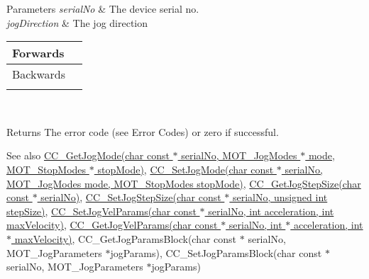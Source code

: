 \begin{DoxyParams}{Parameters}
{\em serial\+No} & The device serial no. \\
\hline
{\em jog\+Direction} & The jog direction \begin{tabularx}{\linewidth}{|*{2}{>{\raggedright\arraybackslash}X|}}\hline
Forwards&1 \\\cline{1-2}
Backwards&2 \\\cline{1-2}
\end{tabularx}
\\
\hline
\end{DoxyParams}
\begin{DoxyReturn}{Returns}
The error code (see Error Codes) or zero if successful. 
\end{DoxyReturn}
\begin{DoxySeeAlso}{See also}
\hyperlink{group___k_cube_d_c_servo_gaedfce16951a36423bd67cec88d8aee00}{C\+C\+\_\+\+Get\+Jog\+Mode(char const $\ast$ serial\+No, M\+O\+T\+\_\+\+Jog\+Modes $\ast$ mode, M\+O\+T\+\_\+\+Stop\+Modes $\ast$ stop\+Mode)}, \hyperlink{group___k_cube_d_c_servo_gadbac7a9d5c2f6ce7c59b853075139999}{C\+C\+\_\+\+Set\+Jog\+Mode(char const $\ast$ serial\+No, M\+O\+T\+\_\+\+Jog\+Modes mode, M\+O\+T\+\_\+\+Stop\+Modes stop\+Mode)}, \hyperlink{group___k_cube_d_c_servo_gafb6d1fa4b61ec567026da2b1f761ee65}{C\+C\+\_\+\+Get\+Jog\+Step\+Size(char const $\ast$ serial\+No)}, \hyperlink{group___k_cube_d_c_servo_ga1d986216045157d086ab1c9f80b9d461}{C\+C\+\_\+\+Set\+Jog\+Step\+Size(char const $\ast$ serial\+No, unsigned int step\+Size)}, \hyperlink{group___k_cube_d_c_servo_ga6fca67412dd838f9d4b94922379e7e59}{C\+C\+\_\+\+Set\+Jog\+Vel\+Params(char const $\ast$ serial\+No, int acceleration, int max\+Velocity)}, \hyperlink{group___k_cube_d_c_servo_gad5bd91c34f134307376145710c1a4c5b}{C\+C\+\_\+\+Get\+Jog\+Vel\+Params(char const $\ast$ serial\+No, int $\ast$ acceleration, int $\ast$ max\+Velocity)}, C\+C\+\_\+\+Get\+Jog\+Params\+Block(char const $\ast$ serial\+No, M\+O\+T\+\_\+\+Jog\+Parameters $\ast$jog\+Params), C\+C\+\_\+\+Set\+Jog\+Params\+Block(char const $\ast$ serial\+No, M\+O\+T\+\_\+\+Jog\+Parameters $\ast$jog\+Params)


\end{DoxySeeAlso}

\begin{DoxyCodeInclude}
\end{DoxyCodeInclude}
